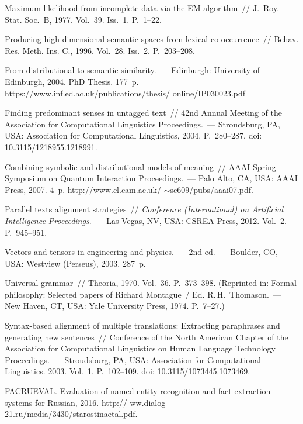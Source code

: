 \begin{multicols}{2}
{{\begin{thebibliography}{99}
Maximum likelihood from incomplete data via the EM algorithm~// 
J.~Roy. Stat. Soc.~B, 1977. Vol.~39. Iss.~1. P.~1--22.

 Producing high-dimensional semantic spaces from 
lexical co-occurrence~// 
Behav. Res. Meth. Ins. C., 1996. Vol.~28. Iss.~2. 
P.~203--208.

 From distributional to semantic similarity.~--- 
Edinburgh: University of 
Edinburgh, 2004. PhD Thesis. 177~p.
{\sf https://www.inf.ed.ac.uk/publications/thesis/ online/IP030023.pdf}

 Finding predominant 
senses in untagged text~// 42nd Annual Meeting of the Association for 
Computational Linguistics Proceedings.~---
Stroudsburg, PA, USA: Association for 
Computational Linguistics, 2004. P.~280--287. doi: 10.3115/1218955.1218991.

 Combining symbolic and distributional models of 
meaning~// AAAI Spring Symposium on Quantum Interaction Proceedings.~--- 
Palo Alto, CA, USA: AAAI Press, 2007. 4~p. {\sf 
http://www.cl.cam.ac.uk/ $\sim$sc609/pubs/aaai07.pdf.}

 Parallel texts alignment strategies~// 
\textit{Conference (International) on Artificial Intelligence Proceedings}.~--- 
Las Vegas, NV, USA: CSREA Press, 
2012. Vol.~2. P.~945--951.

 Vectors and tensors in engineering and physics.~--- 
2nd ed.~--- Boulder, CO, USA: Westview (Perseus), 2003. 287~p.

 Universal grammar~// Theoria, 1970. Vol.~36. P.~373--398. 
(Reprinted in: Formal philosophy: Selected 
papers of Richard Montague~/ 
Ed. R.\,H.~Thomason.~--- 
New Haven, CT, USA: Yale University Press, 1974. P.~7--27.)

 Syntax-based alignment of multiple translations: 
Extracting paraphrases and generating new sentences~// 
Conference of the North 
American Chapter of the Association for Computational Linguistics on Human Language 
Technology Proceedings.~--- 
Stroudsburg, PA, USA: Association for Computational Linguistics.
2003. Vol.~1. P.~102--109. doi: 10.3115/1073445.1073469.

FACRUEVAL. Evaluation of named entity recognition and fact extraction systems for 
Russian, 2016. {\sf http:// ww.dialog-21.ru/media/3430/starostinaetal.pdf.}
 \end{thebibliography}

 }
 }

\end{multicols}

